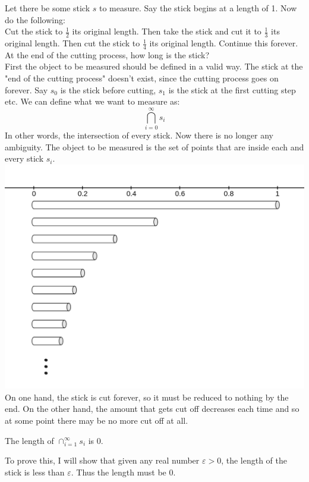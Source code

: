 \documentclass[11pt]{ekblite}
\begin{document}
\begin{example}
	Let there be some stick $s$ to measure. Say the stick begins at a length of 1. Now do the following:
	\\[0.2in]Cut the stick to $\frac{1}{2}$ its original length. Then take the stick and cut it to $\frac{1}{3}$ its original length. Then cut the stick to $\frac{1}{4}$ its original length. Continue this forever.
	\\[0.2in]At the end of the cutting process, how long is the stick?
	\\[0.2in]First the object to be measured should be defined in a valid way. The stick at the "end of the cutting process" doesn't exist, since the cutting process goes on forever. Say $s_0$ is the stick before cutting, $s_1$ is the stick at the first cutting step etc. We can define what we want to measure as:
	\[\bigcap_{i=0}^{\infty} s_i\]
	In other words, the intersection of every stick. Now there is no longer any ambiguity. The object to be measured is the set of points that are inside each and every stick $s_i$.
	\\\includegraphics[scale=0.3]{img/c5.jpg}
	\\[0.2in]On one hand, the stick is cut forever, so it must be reduced to nothing by the end. On the other hand, the amount that gets cut off decreases each time and so at some point there may be no more cut off at all.
	\begin{corollary}
		The length of $\cap_{i=1}^{\infty} s_i$ is 0. 
	\end{corollary}
	To prove this, I will show that given any real number $\varepsilon > 0$, the length of the stick is less than $\varepsilon$. Thus the length must be 0.

\end{example}
\end{document}
